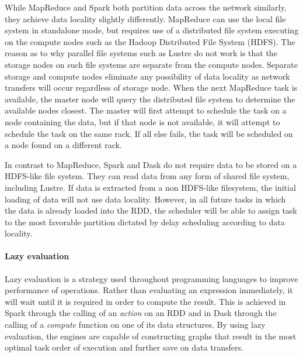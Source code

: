                     While MapReduce and Spark both partition data across the
                    network similarly, they achieve data locality slightly
                    differently. MapReduce can use the local file system in
                    standalone mode, but requires use of a distributed
                    file system executing on the compute nodes such as the Hadoop
                    Distributed File System (HDFS). The reason as to why
                    parallel file systems such as Lustre do not work is that the
                    storage nodes on such file systems are separate from the compute nodes.
                    Separate storage and compute nodes eliminate
                    any possibility of data locality as network transfers will
                    occur regardless of storage node. When the next MapReduce
                    task is available, the master node will query the
                    distributed file system to determine the available nodes
                    closest. The master will first attempt to schedule the task
                    on a node containing the data, but if that node is not
                    available, it will attempt to schedule the task on the same
                    rack. If all else fails, the task will be scheduled on a
                    node found on a different rack. 

                    In contrast to MapReduce, Spark and Dask do not require data
                    to be stored on a HDFS-like file system. They can read data
                    from any form of shared file system, including Lustre. If
                    data is extracted from a non HDFS-like filesystem, the
                    initial loading of data will not use data locality. However,
                    in all future tasks in which the data is already loaded into
                    the RDD, the scheduler will be able to assign task to the
                    most favorable partition dictated by delay scheduling
                    according to data locality.

                    
                \paragraph{Lazy evaluation}

                    Lazy evaluation is a strategy used throughout programming
                    languages to improve performance of operations. Rather than
                    evaluating an expression immediately, it will wait until it
                    is required in order to compute the result. This is achieved
                    in Spark through the calling of an \textit{action} on an RDD
                    and in Dask through the calling of a \textit{compute}
                    function on one of its data structures. By using lazy
                    evaluation, the engines are capable of constructing graphs
                    that result in the most optimal task order of execution and
                    further save on data transfers. 

